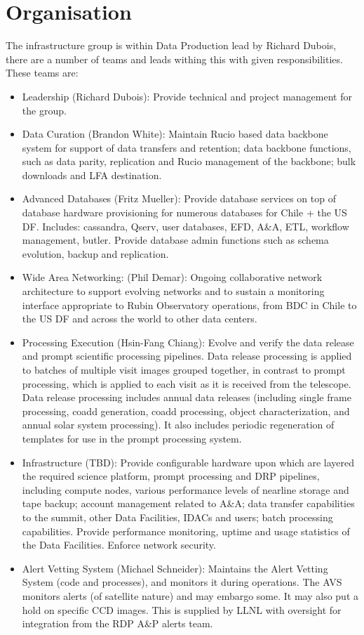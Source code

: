 \section{Organisation} \label{sec:org}

The infrastructure group is within Data Production lead by Richard Dubois, there are a number of teams and leads withing this
with given responsibilities. These teams are:
\begin{itemize}
\item Leadership (Richard Dubois): Provide technical and project management for the group.
\item {Data Curation (Brandon White): Maintain \gls{Rucio} based data backbone system for support of data transfers and retention; data backbone functions, such as data parity, replication and \gls{Rucio} management of the backbone; bulk downloads and LFA destination.}
\item {Advanced Databases (Fritz Mueller): Provide database services on top of database hardware provisioning for numerous databases for Chile + the US \gls{DF}. Includes: cassandra, Qserv, user databases, EFD, A\&A, ETL, workflow management, butler. Provide database admin functions such as schema evolution, backup and replication.}
\item {Wide Area Networking: (Phil Demar): Ongoing collaborative network
    architecture to support evolving networks and to sustain a
    \gls{monitoring} interface appropriate to Rubin Observatory operations,
    from BDC in Chile to the US \gls{DF} and across the world to other data
    centers.}
  \item {Processing Execution (Hsin-Fang Chiang): Evolve and verify the data release and prompt scientific processing pipelines. Data release processing is applied to batches of multiple visit images grouped together, in contrast to prompt processing, which is applied to each visit as it is received from the telescope. Data release processing includes annual data releases (including single frame processing, coadd generation, coadd processing, object characterization, and annual solar system processing). It also includes periodic regeneration of templates for use in the prompt processing system.}
\item {Infrastructure (TBD): Provide configurable hardware upon which are layered the required science platform, prompt processing and \gls{DRP} pipelines, including compute nodes, various performance levels of nearline storage and tape backup; account management related to A\&A; data transfer capabilities to the summit, other Data Facilities, IDACs and users; batch processing capabilities. Provide performance monitoring, uptime and usage statistics of the Data Facilities. Enforce network security.}
\item {Alert Vetting System (Michael Schneider): Maintains the \gls{Alert}
    Vetting System (code and processes), and monitors it during
    operations. The \gls{AVS} monitors alerts (of satellite nature) and may
    embargo some. It may also put a hold on specific \gls{CCD} images. This
    is supplied by LLNL with oversight for integration from the \gls{RDP} A\&P alerts team.}
\end{itemize}



